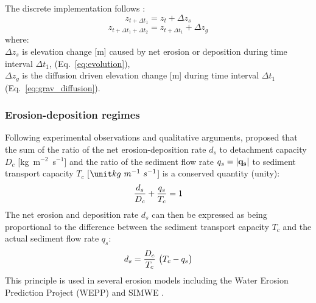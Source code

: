 \documentclass[gmd, manuscript]{copernicus}
\begin{document}
\noindent
The discrete implementation follows \cite{Thaxton2004}:
\begin{equation}
\label{eq:evolution_disc1} 
z_{t+ \Delta t_1} = z_t + \Delta z_s  
\end{equation}
\begin{equation}
\label{eq:evolution_disc2} 
z_{t+\Delta t_1+\Delta t_2} = z_{t+\Delta t_1} + \Delta z_g 
\end{equation}
{\small
where: \\
\noindent
\hspace*{0.5em} $\Delta z_s$ is elevation change [\unit{m}] caused by net erosion or deposition during time interval $\Delta t_1$,
(Eq.~\ref{eq:evolution}),\\
\hspace*{0.5em} $\Delta z_g$ is the diffusion driven elevation change [\unit{m}] during time interval $\Delta t_1$ 
(Eq.~\ref{eq:grav_diffusion}).\\
}

\subsubsection{Erosion-deposition regimes}

Following experimental observations and qualitative arguments, 
\cite{Foster1977} proposed that the sum of 
the ratio of the net erosion-deposition rate $d_s$ 
to detachment capacity  $D_c$  [\unit{kg~m}$^{-2}$~\unit{s}$^{-1}$] 
and the ratio of the sediment flow rate $q_s = |{\bf q_s}|$ 
to sediment transport capacity $T_c$ [$\unit kg~m^{-1}~s^{-1}$]
is a conserved quantity (unity):
\begin{equation}
\label{eq:foster_law}
{d_s \over D_c} + {q_s \over T_c} = 1
\end{equation}
The net erosion and deposition rate $d_s$ can then be expressed 
as being proportional to the difference between
the sediment transport capacity $T_c$ 
and the actual sediment flow rate $q_s$:
\begin{equation}
\label{eq:sigma}
d_s = {D_c \over T_c}~\bigl( T_c - q_s\bigr)
\end{equation}
\noindent
This principle is used in several erosion models 
including the Water Erosion Prediction Project (WEPP) \citep{Flanagan2013} 
and SIMWE \citep{Mitas1998}. 
\end{document}
